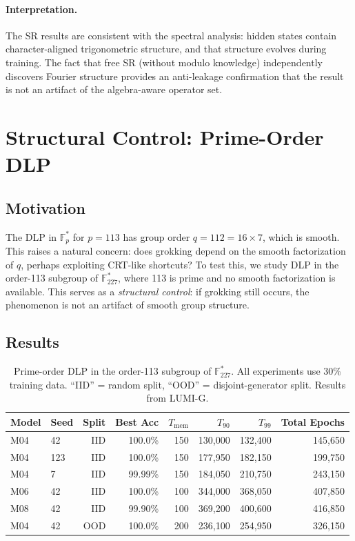 \documentclass[11pt]{article}
\newcommand{\Fps}{\mathbb{F}_p^*}
\newcommand{\Tmem}{T_{\mathrm{mem}}}
\newcommand{\Tninety}{T_{90}}
\newcommand{\Tnine}{T_{99}}
\begin{document}
\paragraph{Interpretation.}
The SR results are consistent with the spectral analysis: hidden states contain character-aligned trigonometric structure, and that structure evolves during training. The fact that free SR (without modulo knowledge) independently discovers Fourier structure provides an anti-leakage confirmation that the result is not an artifact of the algebra-aware operator set.



\section{Structural Control: Prime-Order DLP}
\label{sec:prime_order}

\subsection{Motivation}

The DLP in $\Fps$ for $p = 113$ has group order $q = 112 = 16 \times 7$, which is smooth. This raises a natural concern: does grokking depend on the smooth factorization of $q$, perhaps exploiting CRT-like shortcuts? To test this, we study DLP in the order-113 subgroup of $\mathbb{F}_{227}^*$, where 113 is prime and no smooth factorization is available. This serves as a \emph{structural control}: if grokking still occurs, the phenomenon is not an artifact of smooth group structure.

\subsection{Results}

\begin{table}[H]
\centering
\caption{Prime-order DLP in the order-113 subgroup of $\mathbb{F}_{227}^*$. All experiments use 30\% training data. ``IID'' = random split, ``OOD'' = disjoint-generator split. Results from LUMI-G.}
\label{tab:prime_order_results}
\begin{tabular}{llrrrrrr}
\toprule
Model & Seed & Split & Best Acc & $\Tmem$ & $\Tninety$ & $\Tnine$ & Total Epochs \\
\midrule
M04 & 42 & IID & 100.0\% & 150 & 130,000 & 132,400 & 145,650 \\
M04 & 123 & IID & 100.0\% & 150 & 177,950 & 182,150 & 199,750 \\
M04 & 7 & IID & 99.99\% & 150 & 184,050 & 210,750 & 243,150 \\
M06 & 42 & IID & 100.0\% & 100 & 344,000 & 368,050 & 407,850 \\
M08 & 42 & IID & 99.90\% & 100 & 369,200 & 400,600 & 416,850 \\
M04 & 42 & OOD & 100.0\% & 200 & 236,100 & 254,950 & 326,150 \\
\bottomrule
\end{tabular}
\end{table}
\end{document}
